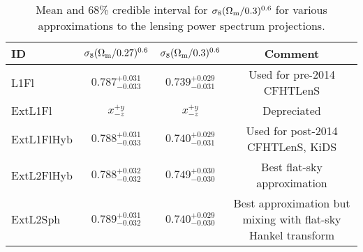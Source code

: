 \renewcommand{\baselinestretch}{1.5}
\begin{table}

  \label{tab:CFHTLenS_Sigma8}

  \caption{Mean and 68\% credible interval for 
  $\sigma_8 (\Omega_{\rm m}/0.3)^{0.6}$ for various approximations to the lensing
  power spectrum projections.}

  \begin{tabular}{lccc} \hline
  ID         & $\sigma_8 (\Omega_{\rm m}/0.27)^{0.6}$ & $\sigma_8 (\Omega_{\rm m}/0.3)^{0.6}$ & Comment \\ \hline
  L1Fl       & $0.787^{+0.031}_{-0.033}$ & $0.739^{+0.029}_{-0.031}$ & Used for pre-2014 CFHTLenS \\
  ExtL1Fl    & $x^{+y}_{-z}$ & $x^{+y}_{-z}$ & Depreciated \\
  ExtL1FlHyb & $0.788^{+0.031}_{-0.033}$ & $0.740^{+0.029}_{-0.031}$ & Used for post-2014 CFHTLenS, KiDS \\
  ExtL2FlHyb & $0.788^{+0.032}_{-0.032}$ & $0.749^{+0.030}_{-0.030}$ & Best flat-sky approximation \\
  ExtL2Sph   & $0.789^{+0.031}_{-0.032}$ & $0.740^{+0.029}_{-0.030}$ & Best approximation but mixing with flat-sky Hankel transform \\ \hline
  \end{tabular}

\end{table}
\renewcommand{\baselinestretch}{1}


